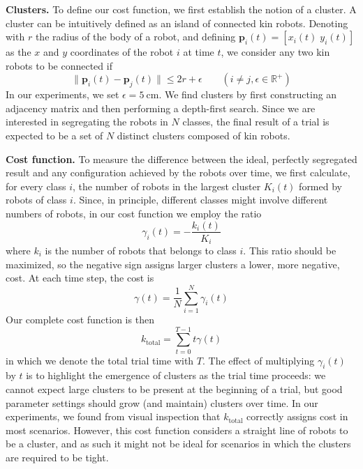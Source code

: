 \documentclass[letterpaper, 10 pt, conference]{ieeeconf}
\newcommand{\myparagraph}[1]{\textbf{#1.}}
\renewcommand{\vec}[1]{\ensuremath{\mathbf{#1}}}
\begin{document}
\myparagraph{Clusters}
To define our cost function, we first establish the notion of a cluster.  A
cluster can be intuitively defined as an island of connected kin robots.
Denoting with $r$ the radius of the body of a robot, and defining
$\vec{p}_i(t) = [x_i(t)\;y_i(t)]$ as the $x$ and $y$ coordinates of the robot
$i$ at time $t$, we consider any two kin robots to be connected if
\begin{equation} \label{eq:connected}
  \lVert\vec{p}_i(t) - \vec{p}_j(t)\rVert \le 2r + \epsilon \qquad (i \ne j, \epsilon \in \mathbb{R}^+)
\end{equation}
In our experiments, we set $\epsilon = \SI{5}{\centi\meter}$.
We find clusters by first constructing an adjacency matrix and then performing a depth-first search.
Since we are interested in segregating the robots in $N$ classes,
the final result of a trial is expected to be a set of $N$ distinct clusters composed of kin robots.

\myparagraph{Cost function}
To measure the difference between the ideal, perfectly segregated result and any
configuration achieved by the robots over time, we first calculate, for every
class $i$, the number of robots in the largest cluster $K_i(t)$ formed by robots
of class $i$. Since, in principle, different classes might involve different
numbers of robots, in our cost function we employ the ratio
$$
\gamma_i(t) = -\frac{k_i(t)}{K_i}
$$
where $k_i$ is the number of robots that belongs to class $i$. This ratio should
be maximized, so the negative sign assigns larger clusters a lower, more
negative, cost.  At each time step, the cost is
$$
\gamma(t) = \frac{1}{N}\sum_{i=1}^N\gamma_i(t)
$$
Our complete cost function is then
\begin{equation}
  \label{eq:cost_function}
  k_{\text{total}} =  \sum_{t=0}^{T-1} t\gamma(t)
\end{equation}
in which we denote the total trial time with $T$. The effect of multiplying
$\gamma_i(t)$ by $t$ is to highlight the emergence of clusters as the trial time
proceeds: we cannot expect large clusters to be present at the beginning of a
trial, but good parameter settings should grow (and maintain) clusters over
time. In our experiments, we found from visual inspection that
$k_{\text{total}}$ correctly assigns cost in most scenarios.  However, this cost
function considers a straight line of robots to be a cluster, and as such it
might not be ideal for scenarios in which the clusters are required to be tight.
\end{document}
